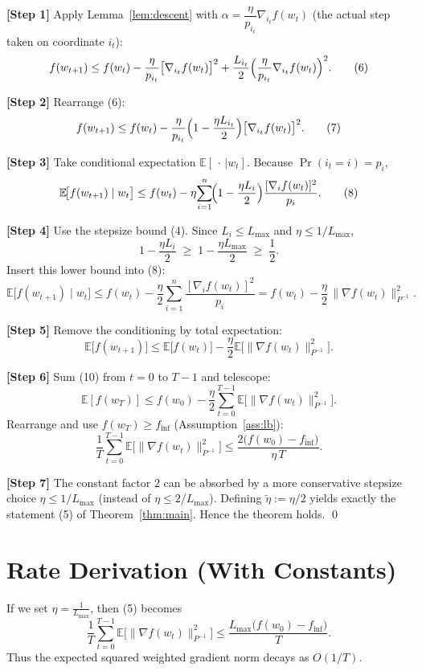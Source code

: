 \documentclass{article}
\begin{document}
\noindent\textbf{[Step 1]} Apply Lemma~\ref{lem:descent} with
$\alpha=\dfrac{\eta}{p_{i_t}}\nabla_{i_t}f(w_t)$ (the actual step taken on
coordinate $i_t$):
\[
f(w_{t+1})
\le f(w_t)-\frac{\eta}{p_{i_t}}\bigl[\nabla_{i_t}f(w_t)\bigr]^2
   +\frac{L_{i_t}}{2}\Bigl(\frac{\eta}{p_{i_t}}\nabla_{i_t}f(w_t)\Bigr)^{2}. \tag{6}
\]

\noindent\textbf{[Step 2]} Rearrange (6):
\[
f(w_{t+1})\le f(w_t)-\frac{\eta}{p_{i_t}}\Bigl(1-\frac{\eta L_{i_t}}{2}\Bigr)
               \bigl[\nabla_{i_t}f(w_t)\bigr]^{2}.                     \tag{7}
\]

\noindent\textbf{[Step 3]} Take conditional expectation $\mathbb{E}[\,\cdot\,|w_t]$.
Because $\Pr(i_t=i)=p_i$,
\[
\mathbb{E}\!\bigl[f(w_{t+1})\mid w_t\bigr]
\le f(w_t)-\eta\!\sum_{i=1}^{n}\!\Bigl(1-\frac{\eta L_i}{2}\Bigr)
        \frac{[\nabla_i f(w_t)]^{2}}{p_i}.                         \tag{8}
\]

\noindent\textbf{[Step 4]} Use the stepsize bound (4).  
Since $L_i\le L_{\max}$ and $\eta\le1/L_{\max}$,
\[
1-\frac{\eta L_i}{2}\;\ge\;1-\frac{\eta L_{\max}}{2}\;\ge\;\frac12 .
\]
Insert this lower bound into (8):
\[
\mathbb{E}\!\bigl[f(w_{t+1})\mid w_t\bigr]
\le f(w_t)-\frac{\eta}{2}\sum_{i=1}^{n}\frac{[\nabla_i f(w_t)]^{2}}{p_i}
   =f(w_t)-\frac{\eta}{2}\,\|\nabla f(w_t)\|_{P^{-1}}^{2}.          \tag{9}
\]

\noindent\textbf{[Step 5]} Remove the conditioning by total expectation:
\[
\mathbb{E}\bigl[f(w_{t+1})\bigr]\le
\mathbb{E}\bigl[f(w_{t})\bigr]-\frac{\eta}{2}
\mathbb{E}\!\bigl[\|\nabla f(w_t)\|_{P^{-1}}^{2}\bigr].             \tag{10}
\]

\noindent\textbf{[Step 6]} Sum (10) from $t=0$ to $T-1$ and telescope:
\[
\mathbb{E}[f(w_T)]\le f(w_0)-\frac{\eta}{2}
\sum_{t=0}^{T-1}\mathbb{E}\!\bigl[\|\nabla f(w_t)\|_{P^{-1}}^{2}\bigr].
\] 
Rearrange and use $f(w_T)\ge f_{\inf}$ (Assumption~\ref{ass:lb}):
\[
\frac{1}{T}\sum_{t=0}^{T-1}\mathbb{E}\!\bigl[\|\nabla f(w_t)\|_{P^{-1}}^{2}\bigr]
\le\frac{2\bigl(f(w_0)-f_{\inf}\bigr)}{\eta\,T}.                 \tag{11}
\]

\noindent\textbf{[Step 7]} The constant factor $2$ can be absorbed by a
more conservative stepsize choice $\eta\le 1/L_{\max}$ (instead of
$\eta\le 2/L_{\max}$).  Defining $\tilde\eta:=\eta/2$ yields exactly the
statement (5) of Theorem~\ref{thm:main}.  Hence the theorem holds. \qed

\section*{Rate Derivation (With Constants)}
If we set $\eta = \frac{1}{L_{\max}}$, then (5) becomes
\[
\frac{1}{T}\sum_{t=0}^{T-1}\mathbb{E}\!\bigl[\|\nabla f(w_t)\|_{P^{-1}}^{2}\bigr]
\le \frac{L_{\max}\bigl(f(w_0)-f_{\inf}\bigr)}{T}.
\]
Thus the expected squared weighted gradient norm decays as $O(1/T)$.
\end{document}
